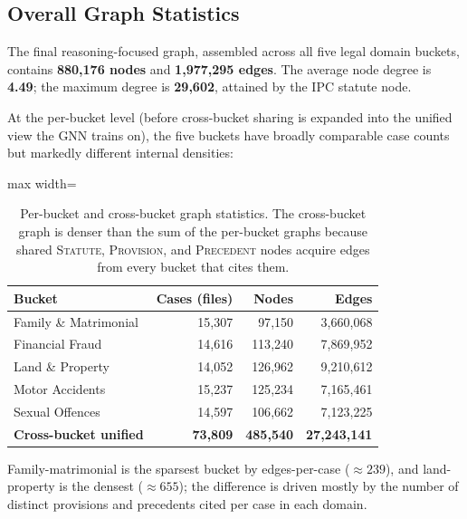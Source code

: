 \subsection{Overall Graph Statistics}

The final reasoning-focused graph, assembled across all five legal
domain buckets, contains \textbf{880{,}176 nodes} and
\textbf{1{,}977{,}295 edges}. The average node degree is
\textbf{4.49}; the maximum degree is \textbf{29{,}602}, attained by
the \textsc{IPC} statute node.

At the per-bucket level (before cross-bucket sharing is expanded into
the unified view the GNN trains on), the five buckets have broadly
comparable case counts but markedly different internal densities:

\begin{table}[H]
  \centering
  \small
  \begin{adjustbox}{max width=\textwidth}
  \begin{tabular}{lrrr}
    \toprule
    Bucket & Cases (files) & Nodes & Edges \\
    \midrule
    Family \& Matrimonial & 15{,}307 & 97{,}150 & 3{,}660{,}068 \\
    Financial Fraud & 14{,}616 & 113{,}240 & 7{,}869{,}952 \\
    Land \& Property & 14{,}052 & 126{,}962 & 9{,}210{,}612 \\
    Motor Accidents & 15{,}237 & 125{,}234 & 7{,}165{,}461 \\
    Sexual Offences & 14{,}597 & 106{,}662 & 7{,}123{,}225 \\
    \midrule
    \textbf{Cross-bucket unified} & \textbf{73{,}809} & \textbf{485{,}540}
      & \textbf{27{,}243{,}141} \\
    \bottomrule
  \end{tabular}
  \end{adjustbox}
  \caption{Per-bucket and cross-bucket graph statistics. The
  cross-bucket graph is denser than the sum of the per-bucket graphs
  because shared \textsc{Statute}, \textsc{Provision}, and
  \textsc{Precedent} nodes acquire edges from every bucket that cites
  them.}
  \label{tab:graph_stats}
\end{table}

Family-matrimonial is the sparsest bucket by edges-per-case
(\(\approx 239\)), and land-property is the densest (\(\approx 655\));
the difference is driven mostly by the number of distinct provisions
and precedents cited per case in each domain.


